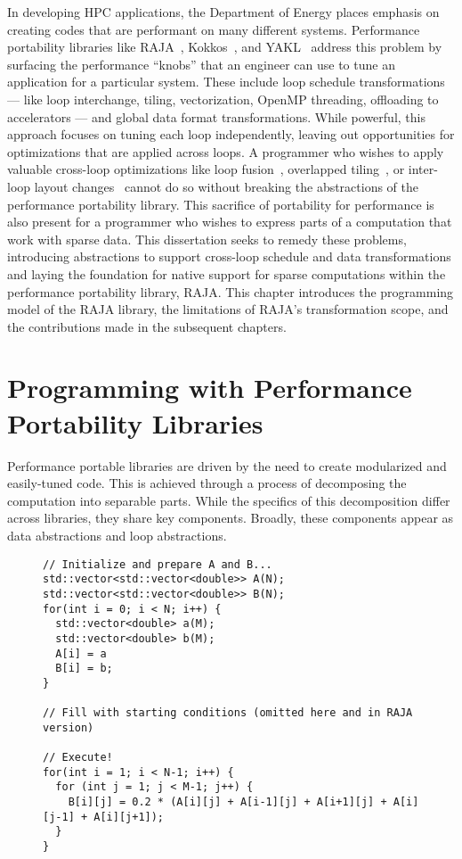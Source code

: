 In developing HPC applications, the Department of Energy places emphasis on creating codes that are performant on many different systems.
Performance portability libraries like RAJA~\cite{hornung2014RAJA}, Kokkos~\cite{edwards2014kokkos}, and YAKL~\cite{norman2022portable} address this problem by surfacing the performance ``knobs'' that an engineer can use to tune an application for a particular system. 
These include loop schedule transformations --- like loop interchange, tiling, vectorization, OpenMP threading, offloading to accelerators --- and global data format transformations.
While powerful, this approach focuses on tuning each loop independently, leaving out opportunities for optimizations that are applied across loops.
A programmer who wishes to apply valuable cross-loop optimizations like loop fusion~\cite{mckinley1996improving}, overlapped tiling~\cite{bertolacci2019using,zhou2012hierarchical,CathieSC14}, or inter-loop layout changes~\cite{kennedy1995automatic,kennedy1998automatic} cannot do so without breaking the abstractions of the performance portability library.
This sacrifice of portability for performance is also present for a programmer who wishes to express parts of a computation that work with sparse data.
This dissertation seeks to remedy these problems, introducing abstractions to support cross-loop schedule and data transformations and laying the foundation for native support for sparse computations within the performance portability library, RAJA\@.
This chapter introduces the programming model of the RAJA library, the limitations of RAJA's transformation scope, and the contributions made in the subsequent chapters. 

\section{Programming with Performance Portability Libraries}

Performance portable libraries are driven by the need to create modularized and easily-tuned code.
This is achieved through a process of decomposing the computation into separable parts.
While the specifics of this decomposition differ across libraries, they share key components.
Broadly, these components appear as data abstractions and loop abstractions.

\begin{figure}[h]
\begin{lstlisting}[caption={C++ reference implementation of a 5-point stencil computation.},label=stencilCpp]
// Initialize and prepare A and B...
std::vector<std::vector<double>> A(N);
std::vector<std::vector<double>> B(N);
for(int i = 0; i < N; i++) {
  std::vector<double> a(M);
  std::vector<double> b(M);
  A[i] = a
  B[i] = b;
}

// Fill with starting conditions (omitted here and in RAJA version)

// Execute!
for(int i = 1; i < N-1; i++) {
  for (int j = 1; j < M-1; j++) {
    B[i][j] = 0.2 * (A[i][j] + A[i-1][j] + A[i+1][j] + A[i][j-1] + A[i][j+1]);
  }
}
\end{lstlisting}
\end{figure}

